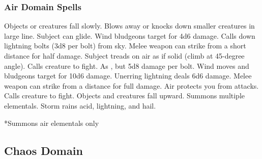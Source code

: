 \subsubsection{Air Domain Spells}
\begin{spelllist}
   Objects or creatures fall slowly.
   Blows away or knocks down smaller creatures in large line.
   Subject can glide.
   Wind bludgeons target for 4d6 damage.
   Calls down lightning bolts (3d8 per bolt) from sky.
   Melee weapon can strike from a short distance for half damage.
   Subject treads on air as if solid (climb at 45-degree angle).
   Calls creature to fight.
   As , but 5d8 damage per bolt.
   Wind moves and bludgeons target for 10d6 damage.
   Unerring lightning deals 6d6 damage.
   Melee weapon can strike from a distance for full damage.
   Air protects you from attacks. 
   Calls creature to fight.
   Objects and creatures fall upward.
   Summons multiple elementals.
   Storm rains acid, lightning, and hail.
\end{spelllist}
*Summons air elementals only

\subsection{Chaos Domain}

